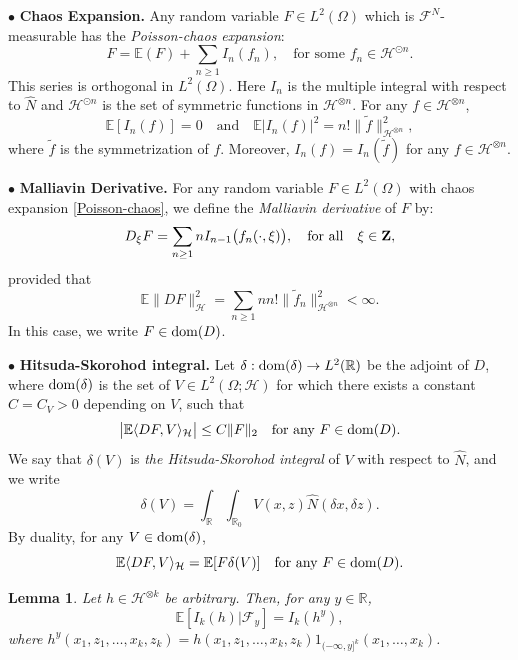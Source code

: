 \documentclass[12pt]{article}
\newtheorem{lemma}[theorem]{Lemma}
\def\cF{\mathcal{F}}
\def\cH{\mathcal{H}}
\def\bE{\mathbb{E}}
\def\bR{\mathbb{R}}
\begin{document}
$\bullet$ {\bf Chaos Expansion.}
Any random variable $F \in L^2(\Omega)$ which is $\cF^N$-measurable has the {\em Poisson-chaos expansion}:
\begin{equation}
\label{Poisson-chaos}
F=\bE(F)+\sum_{n\geq 1}I_n(f_n), \quad \mbox{for some $f_n \in \cH^{\odot n}$}.
\end{equation}
This series is orthogonal in $L^2(\Omega)$. Here $I_n$ is the multiple integral with respect to $\widehat{N}$ and $\cH^{\odot n}$ is the set of symmetric functions in $\cH^{\otimes n}$.
For any $f \in \cH^{\otimes n}$,
\[
\bE[I_n(f)]=0 \quad \mbox{and} \quad \bE|I_n(f)|^2=n! \|\widetilde{f}\|_{\cH^{\otimes n}}^2,
\]
where $\widetilde{f}$ is the symmetrization of $f$. Moreover, $I_n(f)=I_n(\widetilde{f})$ for any $f \in \cH^{\otimes n}$.

\medskip 
$\bullet$ {\bf Malliavin Derivative.}
For any random variable $F \in L^2(\Omega)$ with chaos expansion \eqref{Poisson-chaos}, we define the {\em Malliavin derivative} of $F$ by:
\[
D_{\xi}F=\sum_{n\geq 1}nI_{n-1}\big(f_n(\cdot,\xi)\big), \quad \mbox{for all} \quad \xi \in {\bf Z},
\]
provided that 
\[
\bE\|DF\|_{\cH}^2=\sum_{n\geq 1}nn! \|\widetilde{f}_n\|_{\cH^{\otimes n}}^2<\infty.
\] In this case, we write $F \in {\rm dom}(D)$.

\medskip

$\bullet$ {\bf Hitsuda-Skorohod integral.}
Let $\delta:{\rm dom}(\delta) \to L^2(\bR)$ be the adjoint of $D$, where ${\rm dom}(\delta)$ is the set of $V \in L^2(\Omega;\cH)$ for which there exists a constant $C=C_V>0$ depending on $V$, such that 
\[
\big|\bE \langle DF,V \rangle_{\cH}\big| \leq C \|F\|_2 \quad \mbox{for any $F \in {\rm dom}(D)$}.
\] 
We say that $\delta(V)$ is 
{\em the Hitsuda-Skorohod integral} of $V$ with respect to $\widehat{N}$, and we write
\[
\delta(V)=\int_{\bR} \int_{\bR_0}V(x,z)\widehat{N}(\delta x, \delta z).
\]
By duality, for any $V \in {\rm dom}(\delta)$,
\[
\bE\langle DF,V \rangle_{\cH}=\bE[F \delta(V)] \quad \mbox{for any $F \in {\rm dom}(D)$}.
\]


\begin{lemma}
\label{cond-Ik}
Let $h \in \cH^{\otimes k}$ be arbitrary. Then, for any $y \in \bR$,
\[
\bE[I_k(h)|\cF_y]=I_k(h^y), 
\]
where $h^y(x_1,z_1,\ldots,x_k,z_k)=h(x_1,z_1,\ldots,x_k,z_k) 1_{(-\infty,y]^k}(x_1,\ldots,x_k)$.
\end{lemma}
\end{document}
